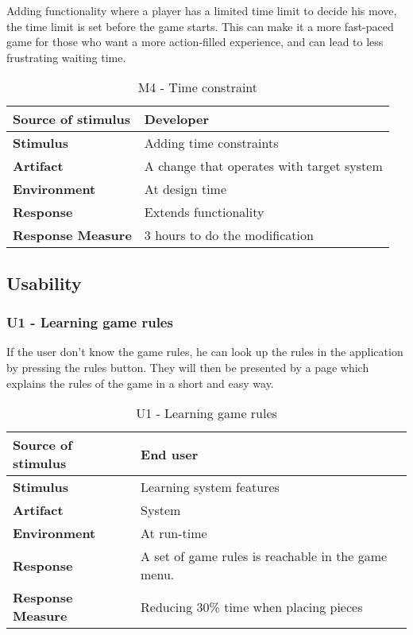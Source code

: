 Adding functionality where a player has a limited time limit to decide his move, the time limit is set before the game starts. This can make it a more fast-paced game for those who want a more action-filled experience, and can lead to less frustrating waiting time.

\begin{table}[h!]
\begin{tabular}{ | p{110pt} | p{250pt}  |}
\hline
\bf Source of stimulus &  Developer  \\ \hline
\bf Stimulus & Adding time constraints \\ \hline 
\bf Artifact & A change that operates with target system  \\  \hline
\bf Environment & At design time \\ \hline
\bf Response & Extends functionality \\ \hline
\bf Response Measure & 3 hours to do the modification \\ \hline

\end{tabular}
\caption{M4 - Time constraint}
\end{table}

\subsection{Usability}

\subsubsection{U1 - Learning game rules}

If the user don't know the game rules, he can look up the rules in the application by pressing the rules button. They will then be presented by a page which explains the rules of the game in a short and easy way.

\begin{table}[h!]
\begin{tabular}{ | p{110pt} | p{250pt}  |}
\hline
\bf Source of stimulus &  End user  \\ \hline
\bf Stimulus & Learning system features \\ \hline 
\bf Artifact & System  \\  \hline
\bf Environment & At run-time \\ \hline
\bf Response & A set of game rules is reachable in the game menu. \\ \hline
\bf Response Measure & Reducing 30\% time when placing pieces \\ \hline

\end{tabular}
\caption{U1 - Learning game rules}
\end{table}


